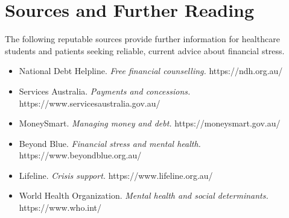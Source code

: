 \section*{Sources and Further Reading}
The following reputable sources provide further information for healthcare students and patients seeking reliable, current advice about financial stress.
\begin{itemize}
    \item National Debt Helpline. \textit{Free financial counselling.} https://ndh.org.au/
    \item Services Australia. \textit{Payments and concessions.} https://www.servicesaustralia.gov.au/
    \item MoneySmart. \textit{Managing money and debt.} https://moneysmart.gov.au/
    \item Beyond Blue. \textit{Financial stress and mental health.} https://www.beyondblue.org.au/
    \item Lifeline. \textit{Crisis support.} https://www.lifeline.org.au/
    \item World Health Organization. \textit{Mental health and social determinants.} https://www.who.int/
\end{itemize}
